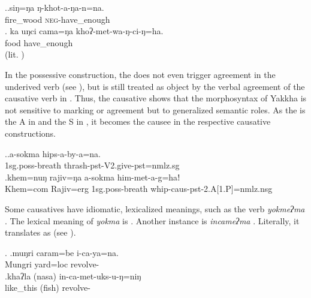 \ex.\ag.siŋ=ŋa ŋ-khot-a-ŋa-n=na.\\
	fire\_wood \textsc{neg}-have\_enough\\
	\bg. ka uŋci cama=ŋa khoʔ-met-wa-ŋ-ci-ŋ=ha.\\
	  food	have\_enough\\
		 (lit. )

		
In the possessive  construction, the  does not even trigger agreement in the underived verb (see \Next[a]), but is still treated as object by the verbal agreement of the causative verb in \Next[b]. Thus, the causative shows that the morphosyntax of Yakkha is not sensitive to  marking or agreement but to generalized semantic roles. As the  is the A in \Last and the S in \Next, it becomes the causee in the respective causative constructions. 

	\ex.\ag.a-sokma hips-a-by-a=na.\\
	{\sc 1sg.poss-}breath thrash{\sc [3sg]-pst-V2.give-pst=nmlz.sg}\\	
	 \bg.khem=nuŋ rajiv=ŋa a-sokma him-met-a-g=haǃ\\
	Khem{\sc =com}  Rajiv{\sc =erg} {\sc 1sg.poss-}breath whip{\sc -caus-pst-2.A[1.P]=nmlz.nsg}\\


Some causatives have idiomatic, lexicalized meanings, such as the verb \emph{yokmeʔma} . The lexical meaning of \emph{yokma} is . Another instance is \emph{incameʔma} . Literally, it translates as  (see \Next).

 
\ex. \ag.muŋri caram=be i-ca-ya=na.\\
Mungri yard{\sc =loc} revolve-\\
\bg.khaʔla (nasa) in-ca-met-uks-u-ŋ=niŋ\\
	like\_this (fish) revolve-\\
 

